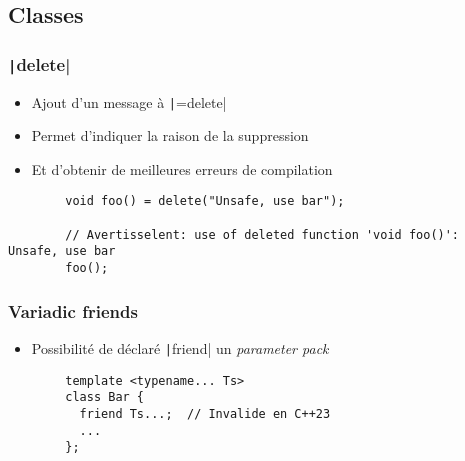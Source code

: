 \documentclass[C++.tex]{subfiles}
\begin{document}
\subsection*{Classes}
\begin{frame}[fragile]
	\frametitle{\texttt|delete|}
	\begin{itemize}
		\item Ajout d'un message à \texttt|=delete|
		\item Permet d'indiquer la raison de la suppression
		\item Et d'obtenir de meilleures erreurs de compilation
	\end{itemize}

	\begin{verbatim}
		void foo() = delete("Unsafe, use bar");

		// Avertisselent: use of deleted function 'void foo()': Unsafe, use bar
		foo();
	\end{verbatim}


\end{frame}

\begin{frame}[fragile]
	\frametitle{Variadic friends}
	\begin{itemize}
		\item Possibilité de déclaré \texttt|friend| un \textit{parameter pack}
	\end{itemize}

	\begin{verbatim}
		template <typename... Ts>
		class Bar {
		  friend Ts...;  // Invalide en C++23
		  ...
		};
	\end{verbatim}

\end{frame}
\end{document}
